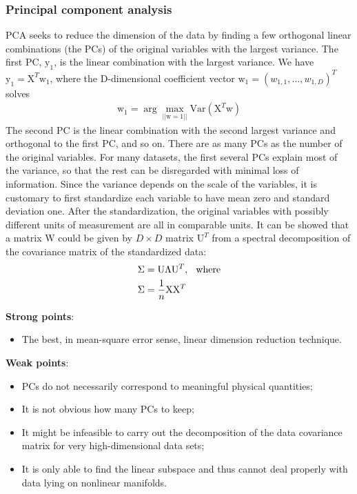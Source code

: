 \documentclass[a4paper]{article}
\begin{document}
\subsubsection{Principal component analysis}

PCA seeks to reduce the dimension of the data by finding a few
orthogonal linear combinations (the PCs) of the original variables with the largest variance. The first PC, $\mathrm{y}_1$, is the linear combination with
the largest variance. We have $\mathrm{y}_1 = \mathrm{X}^T\mathrm{w}_1$, where the D-dimensional
coefficient vector $\mathrm{w}_1 = (w_{1,1},\ldots,w_{1,D})^T$ solves
\begin{align*}
 \mathrm{w}_1 = \arg\max_{||\mathrm{w}=1||}\mathrm{Var}(\mathrm{X}^T\mathrm{w})
\end{align*}
The second PC is the linear combination with the second largest
variance and orthogonal to the first PC, and so on. There are as many
PCs as the number of the original variables. For many datasets, the
first several PCs explain most of the variance, so that the rest can
be disregarded with minimal loss of information. Since the variance depends on the scale of the variables, it is customary to first standardize each variable
to have mean zero and standard deviation one. After the standardization, the original variables with possibly
different units of measurement are all in comparable units. It can be
showed that a matrix $\mathrm{W}$ could be given by $D \times D$ matrix $\mathrm{U}^T$
from a spectral
decomposition of the covariance matrix of the standardized data:
\begin{align*}
\Sigma &= \mathrm{U} \Lambda \mathrm{U}^T, \hspace{0.25cm} \text{where}\\
 \Sigma &=\frac{1}{n}\mathrm{X}\mathrm{X}^T
\end{align*}

\textbf{Strong points}:
\begin{itemize}
\item The best, in mean-square error sense, linear dimension reduction
  technique.
\end{itemize}

\textbf{Weak points}:
\begin{itemize}
\item PCs do not necessarily correspond to meaningful physical
  quantities;
\item It is not obvious how many PCs to keep;
\item It might be infeasible to carry out the decomposition of the data
  covariance matrix for very high-dimensional data sets;
\item It is only able to find the linear subspace and thus cannot deal
  properly with data lying on nonlinear manifolds.
\end{itemize}
\end{document}
